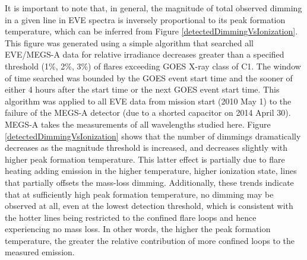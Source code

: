 It is important to note that, in general, the magnitude of total observed dimming in a given line in EVE spectra is inversely proportional to its peak formation temperature, which can be inferred from Figure \ref{detectedDimmingVsIonization}. This figure was generated using a simple algorithm that searched all EVE/MEGS-A data for relative irradiance decreases greater than a specified threshold (1\%, 2\%, 3\%) of flares exceeding GOES X-ray class of C1. The window of time searched was bounded by the GOES event start time and the sooner of either 4 hours after the start time or the next GOES event start time. This algorithm was applied to all EVE data from mission start (2010 May 1) to the failure of the MEGS-A detector (due to a shorted capacitor on 2014 April 30). MEGS-A takes the measurements of all wavelengths studied here. Figure \ref{detectedDimmingVsIonization} shows that the number of dimmings dramatically decreases as the magnitude threshold is increased, and decreases slightly with higher peak formation temperature. This latter effect is partially due to flare heating adding emission in the higher temperature, higher ionization state, lines that partially offsets the mass-loss dimming. Additionally, these trends indicate that at sufficiently high peak formation temperature, no dimming may be observed at all, even at the lowest detection threshold, which is consistent with the hotter lines being restricted to the confined flare loops and hence experiencing no mass loss. In other words, the higher the peak formation temperature, the greater the relative contribution of more confined loops to the measured emission. 

